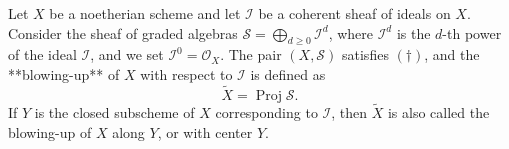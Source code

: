 Let $X$ be a noetherian scheme and let $\mathcal{I}$ be a coherent sheaf of ideals on $X$. Consider the sheaf of graded algebras $\mathcal{S} = \bigoplus_{d \geqslant 0} \mathcal{I}^d$, where $\mathcal{I}^d$ is the $d$-th power of the ideal $\mathcal{I}$, and we set $\mathcal{I}^0 = \mathcal{O}_X$. The pair $(X, \mathcal{S})$ satisfies $(\dagger)$, and the **blowing-up** of $X$ with respect to $\mathcal{I}$ is defined as
$$\tilde{X} = \operatorname{Proj} \mathcal{S}.$$
If $Y$ is the closed subscheme of $X$ corresponding to $\mathcal{I}$, then $\tilde{X}$ is also called the blowing-up of $X$ along $Y$, or with center $Y$.
